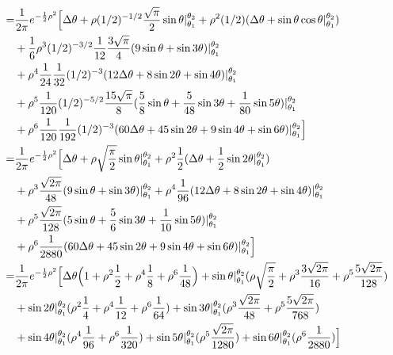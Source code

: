 \documentclass[12pt]{article}
\begin{document}
	\begin{align}
	=& \frac{1}{2\pi}e^{-\frac{1}{2}\rho^2}
		\Big[
		\Delta\theta + \rho(1/2)^{-1/2}\frac{\sqrt{\pi}}{2}\sin\theta|_{\theta_1}^{\theta_2} + \rho^2(1/2)(\Delta\theta + \sin\theta\cos\theta|_{\theta_1}^{\theta_2}) \\ \notag &+ \frac{1}{6}\rho^3(1/2)^{-3/2}\frac{1}{12}\frac{3\sqrt{\pi}}{4}(9\sin\theta+\sin3\theta)|_{\theta_1}^{\theta_2} \\ \notag &+ \rho^4\frac{1}{24}\frac{1}{32}(1/2)^{-3}(12\Delta\theta+8\sin2\theta+\sin4\theta)|_{\theta_1}^{\theta_2} \\ \notag &+ \rho^5\frac{1}{120}(1/2)^{-5/2}\frac{15\sqrt{\pi}}{8}(\frac{5}{8}\sin\theta + \frac{5}{48}\sin3\theta + \frac{1}{80}\sin5\theta)|_{\theta_1}^{\theta_2} \\ \notag &+ \rho^6\frac{1}{120}\frac{1}{192}(1/2)^{-3}(60\Delta\theta + 45\sin2\theta + 9\sin4\theta + \sin6\theta)|_{\theta_1}^{\theta_2}
		\Big] \\
	=& \frac{1}{2\pi}e^{-\frac{1}{2}\rho^2}
		\Big[
		\Delta\theta + \rho\sqrt{\frac{\pi}{2}}\sin\theta|_{\theta_1}^{\theta_2} + \rho^2\frac{1}{2}(\Delta\theta + \frac{1}{2}\sin2\theta|_{\theta_1}^{\theta_2}) \\ \notag &+ \rho^3\frac{\sqrt{2\pi}}{48}(9\sin\theta+\sin3\theta)|_{\theta_1}^{\theta_2} + \rho^4\frac{1}{96}(12\Delta\theta+8\sin2\theta+\sin4\theta)|_{\theta_1}^{\theta_2} \\ \notag &+ \rho^5\frac{\sqrt{2\pi}}{128}(5\sin\theta + \frac{5}{6}\sin3\theta + \frac{1}{10}\sin5\theta)|_{\theta_1}^{\theta_2} \\ \notag &+ \rho^6\frac{1}{2880}(60\Delta\theta + 45\sin2\theta + 9\sin4\theta + \sin6\theta)|_{\theta_1}^{\theta_2}
		\Big] \\
	=& \frac{1}{2\pi}e^{-\frac{1}{2}\rho^2}
		\Big[
		\Delta\theta\Big(1+ \rho^2\frac{1}{2} + \rho^4\frac{1}{8} + \rho^6\frac{1}{48}\Big) + \sin\theta|_{\theta_1}^{\theta_2}(\rho\sqrt{\frac{\pi}{2}} + \rho^3\frac{3\sqrt{2\pi}}{16} + \rho^5\frac{5\sqrt{2\pi}}{128}) \\ \notag &+ \sin2\theta|_{\theta_1}^{\theta_2}(\rho^2\frac{1}{4} + \rho^4\frac{1}{12} + \rho^6\frac{1}{64}) + \sin3\theta|_{\theta_1}^{\theta_2}(\rho^3\frac{\sqrt{2\pi}}{48} + \rho^5\frac{5\sqrt{2\pi}}{768}) \\ \notag &+ \sin4\theta|_{\theta_1}^{\theta_2}(\rho^4\frac{1}{96} + \rho^6\frac{1}{320}) + \sin5\theta|_{\theta_1}^{\theta_2}(\rho^5\frac{\sqrt{2\pi}}{1280}) + \sin6\theta|_{\theta_1}^{\theta_2}(\rho^6\frac{1}{2880})
		\Big]
	\end{align}

\end{document}
